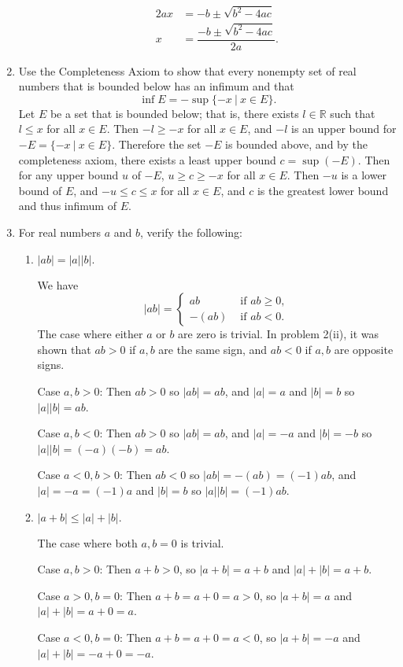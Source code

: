 \begin{enumerate}
\begin{enumerate}[label=(\roman*),align=left]
\begin{align*}
			2ax & = -b \pm \sqrt{b^2-4ac} \\
			x & = \dfrac{-b \pm \sqrt{b^2-4ac}}{2a}.
		\end{align*}
	\end{enumerate}
	\item Use the Completeness Axiom to show that every nonempty set of real numbers that is bounded below has an infimum and that
	\[\inf E =-\sup \{-x \ |\ x \in E\}.\]
	Let $E$ be a set that is bounded below; that is, there exists $l\in \mathbb{R}$ such that $l \le x$ for all $x\in E$.
	Then $-l \ge -x$ for all $x \in E$, and $-l$ is an upper bound for $-E=\{-x \ | \ x\in E\}$. 
	Therefore the set $-E$ is bounded above, and by the completeness axiom, there exists a least upper bound $c= \sup (-E)$.
	Then for any upper bound $u$ of $-E$, $u \ge c \ge -x$ for all $x \in E.$
	Then $-u$ is a lower bound of $E$, and $-u \le c \le x$ for all $x \in E$, and $c$ is the greatest lower bound and thus infimum of $E$.
	\item For real numbers $a$ and $b$, verify the following:
	\begin{enumerate}[label=(\roman*),align=left]
		\item $|ab| = |a||b|.$\par
		We have 
		\[ 
		|ab| =
		\begin{cases} 
			ab & \text{ if } ab \ge 0, \\
			-(ab) & \text{ if } ab < 0.
		\end{cases}
		\]
		The case where either $a$ or $b$ are zero is trivial.
		In problem 2(ii), it was shown that $ab>0$ if $a,b$ are the same sign, and $ab<0$ if $a,b$ are opposite signs.\par
		Case $a,b>0$: Then $ab>0$ so $|ab| = ab$, and $|a| = a$ and $|b|=b$ so $|a||b| = ab$.\par
		Case $a,b<0$: Then $ab>0$ so $|ab| = ab$, and $|a| = -a$ and $|b|=-b$ so $|a||b| = (-a)(-b)=ab$.\par
		Case $a<0,b>0$: Then $ab<0$ so $|ab| = -(ab) = (-1)ab$, and $|a| = -a = (-1)a$ and $|b|=b$ so $|a||b| = (-1)ab$.
		\item $|a+b| \le |a|+|b|.$\par
		The case where both $a,b=0$ is trivial.\par
		Case $a,b>0$: Then $a+b > 0 $, so $|a+b| = a+b$ and $|a|+|b| = a+ b$.\par
		Case $a>0,b=0$: Then $a+b = a+0=a > 0 $, so $|a+b| = a$ and $|a|+|b| = a+ 0 = a$.\par
		Case $a<0,b=0$: Then $a+b = a +0=a<0 $, so $|a+b| = -a$ and $|a|+|b| = -a +0 = -a$.\par

\end{enumerate}
\end{enumerate}
